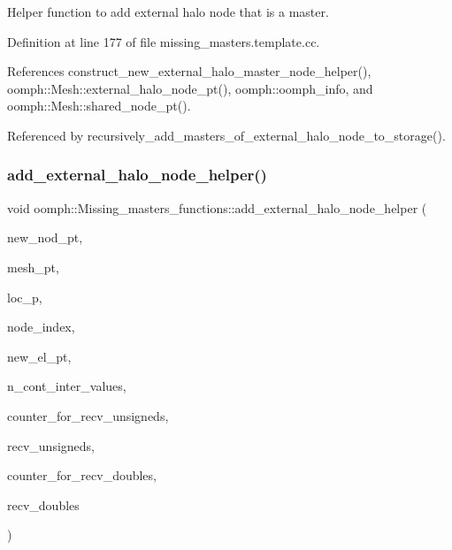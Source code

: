 Helper function to add external halo node that is a master. 



Definition at line 177 of file missing\+\_\+masters.\+template.\+cc.



References construct\+\_\+new\+\_\+external\+\_\+halo\+\_\+master\+\_\+node\+\_\+helper(), oomph\+::\+Mesh\+::external\+\_\+halo\+\_\+node\+\_\+pt(), oomph\+::oomph\+\_\+info, and oomph\+::\+Mesh\+::shared\+\_\+node\+\_\+pt().



Referenced by recursively\+\_\+add\+\_\+masters\+\_\+of\+\_\+external\+\_\+halo\+\_\+node\+\_\+to\+\_\+storage().

\mbox{\label{namespaceoomph_1_1Missing__masters__functions_a537b9f129421d1ad4f6915794d9dd66f}} 
\subsubsection{\texorpdfstring{add\+\_\+external\+\_\+halo\+\_\+node\+\_\+helper()}{add\_external\_halo\_node\_helper()}}
{\footnotesize\ttfamily void oomph\+::\+Missing\+\_\+masters\+\_\+functions\+::add\+\_\+external\+\_\+halo\+\_\+node\+\_\+helper (\begin{DoxyParamCaption}\item[{\hyperlink{classoomph_1_1Node}{Node} $\ast$\&}]{new\+\_\+nod\+\_\+pt,  }\item[{\hyperlink{classoomph_1_1Mesh}{Mesh} $\ast$const \&}]{mesh\+\_\+pt,  }\item[{unsigned \&}]{loc\+\_\+p,  }\item[{unsigned \&}]{node\+\_\+index,  }\item[{\hyperlink{classoomph_1_1FiniteElement}{Finite\+Element} $\ast$const \&}]{new\+\_\+el\+\_\+pt,  }\item[{int \&}]{n\+\_\+cont\+\_\+inter\+\_\+values,  }\item[{unsigned \&}]{counter\+\_\+for\+\_\+recv\+\_\+unsigneds,  }\item[{\hyperlink{classoomph_1_1Vector}{Vector}$<$ unsigned $>$ \&}]{recv\+\_\+unsigneds,  }\item[{unsigned \&}]{counter\+\_\+for\+\_\+recv\+\_\+doubles,  }\item[{\hyperlink{classoomph_1_1Vector}{Vector}$<$ double $>$ \&}]{recv\+\_\+doubles }\end{DoxyParamCaption})}



